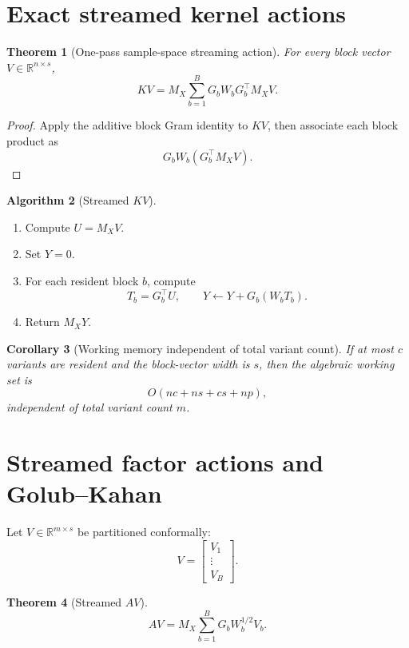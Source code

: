 \documentclass[11pt]{article}
\newtheorem{theorem}{Theorem}[section]
\newtheorem{corollary}[theorem]{Corollary}
\theoremstyle{definition}
\newtheorem{algorithm}[theorem]{Algorithm}
\theoremstyle{remark}
\begin{document}
\section{Exact streamed kernel actions}\label{sec:final-9}

\begin{theorem}[One-pass sample-space streaming action]\label{claim:final-9-1}
For every block vector \(V\in\mathbb R^{n\times s}\),
\[
\boxed{
KV
=
M_X
\sum_{b=1}^B
G_bW_bG_b^\top
M_XV.
}
\]
\end{theorem}

\begin{proof}
Apply the additive block Gram identity to \(KV\), then associate each block
product as
\[
G_bW_b(G_b^\top M_XV).
\]
\end{proof}

\begin{algorithm}[Streamed \(KV\)]\label{claim:final-9-2}
\begin{enumerate}[label=\arabic*.]
\item Compute \(U=M_XV\).
\item Set \(Y=0\).
\item For each resident block \(b\), compute
\[
T_b=G_b^\top U,
\qquad
Y\leftarrow Y+G_b(W_bT_b).
\]
\item Return \(M_XY\).
\end{enumerate}
\end{algorithm}

\begin{corollary}[Working memory independent of total variant count]\label{claim:final-9-3}
If at most \(c\) variants are resident and the block-vector width is \(s\),
then the algebraic working set is
\[
\boxed{
O(nc+ns+cs+np),
}
\]
independent of total variant count \(m\).
\end{corollary}

\section{Streamed factor actions and Golub--Kahan}\label{sec:final-10}

Let \(V\in\mathbb R^{m\times s}\) be partitioned conformally:
\[
V=
\begin{bmatrix}
V_1\\
\vdots\\
V_B
\end{bmatrix}.
\]

\begin{theorem}[Streamed \(AV\)]\label{claim:final-10-1}
\[
\boxed{
AV
=
M_X
\sum_{b=1}^B
G_bW_b^{1/2}V_b.
}
\]
\end{theorem}
\end{document}
